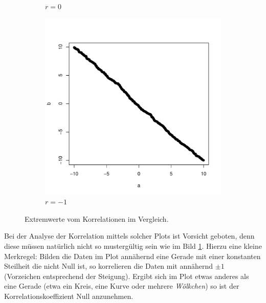 \begin{figure}[h!]
\begin{subfigure}[b]{0.3\textwidth}
\caption{$r=0$}
\end{subfigure}
\begin{subfigure}[b]{0.3\textwidth}
\includegraphics{begriffe-011}
\caption{$r=-1$}
\end{subfigure}
\caption{Extremwerte vom Korrelationen im Vergleich.}
\label{fig:korrelation}
\end{figure}

\noindent
Bei der Analyse der Korrelation mittels solcher Plots ist Vorsicht
geboten, denn diese müssen natürlich nicht so mustergültig sein wie im 
Bild \ref{fig:korrelation}. Hierzu eine kleine Merkregel: Bilden die
Daten im Plot annähernd eine Gerade mit
einer konstanten Steilheit die nicht Null ist, so korrelieren die Daten
mit annähernd $\pm1$ (Vorzeichen entsprechend der Steigung).
Ergibt sich im Plot etwas anderes als eine Gerade (etwa ein Kreis, eine
Kurve oder mehrere \emph{Wölkchen}) so ist der Korrelationskoeffizient
Null anzunehmen.
